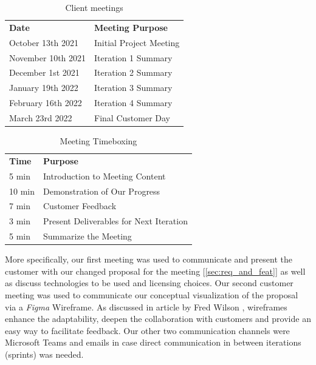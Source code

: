 \documentclass{l3proj}
\begin{document}
        \begin{center}
            \begin{table}[H]
                \centering
                \begin{tabular}{ll}
                \textbf{Date}      & \textbf{Meeting Purpose}
                \\
                October 13th 2021  & Initial Project Meeting \\
                November 10th 2021 & Iteration 1 Summary     \\
                December 1st 2021  & Iteration 2 Summary     \\
                January 19th 2022  & Iteration 3 Summary     \\
                February 16th 2022 & Iteration 4 Summary     \\
                March 23rd 2022    & Final Customer Day   
                \end{tabular}
                \quad
                \caption{Client meetings}
            \end{table}
        \end{center}
        \begin{center}
            \begin{table}[H]
                \centering
                \begin{tabular}{ll}
                    \textbf{Time}   & \textbf{Purpose}                                 \\
                    5  min  & Introduction to Meeting Content         \\
                    10 min & Demonstration of Our Progress           \\
                    7  min  & Customer Feedback                       \\
                    3  min  & Present Deliverables for Next Iteration \\
                    5  min  & Summarize the Meeting                  
                    \end{tabular}
                \label{tab:my_label}
                \caption{Meeting Timeboxing}
            \end{table}
        \end{center}
        
        \newline
        \newline
        More specifically, our first meeting was used to communicate and present the customer with our changed proposal for the meeting [\ref{sec:req_and_feat}] as well as discuss technologies to be used and licensing choices. Our second customer meeting was used to communicate our conceptual visualization of the proposal via a \textit{Figma} Wireframe. As discussed in article by Fred Wilson \cite{wireframe}, wireframes enhance the adaptability, deepen the collaboration with customers and provide an easy way to facilitate feedback.
        \newline
        \newline
        Our other two communication channels were Microsoft Teams and emails in case direct communication in between iterations (sprints) was needed.
        
\end{document}
